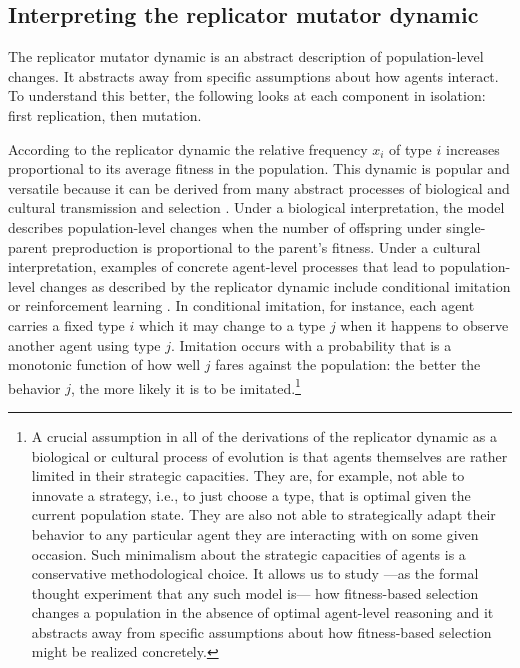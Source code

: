 \documentclass[a4paper, 11pt]{article}
\theoremstyle{Satz}
\begin{document}
\subsection{Interpreting the replicator mutator dynamic}

The replicator mutator dynamic is an abstract description of population-level changes. It
abstracts away from specific assumptions about how agents interact. To understand this better,
the following looks at each component in isolation: first replication, then mutation.

According to the replicator dynamic the relative frequency $x_i$ of type $i$ increases
proportional to its average fitness in the population. This dynamic is popular and versatile
because it can be derived from many abstract processes of biological and cultural transmission
and selection \citep[for overview and several derivations
see][]{Sandholm2010:Population-Game}. Under a biological interpretation, the model describes
population-level changes when the number of offspring under single-parent preproduction is
proportional to the parent's fitness. Under a cultural interpretation, examples of concrete
agent-level processes that lead to population-level changes as described by the replicator
dynamic include conditional imitation
\citep[e.g.,][]{Helbing1996:A-Stochastic-Be,Schlag1998:Why-Imitate-and} or reinforcement
learning \citep[e.g.,][]{BorgersSarin997:Learning-Throug,Beggs2005:On-the-Converge}. In
conditional imitation, for instance, each agent carries a fixed type $i$ which it may change to
a type $j$ when it happens to observe another agent using type $j$. Imitation occurs with a
probability that is a monotonic function of how well $j$ fares against the population: the
better the behavior $j$, the more likely it is to be imitated.\footnote{A crucial assumption in
  all of the derivations of the replicator dynamic as a biological or cultural process of
  evolution is that agents themselves are rather limited in their strategic capacities. They
  are, for example, not able to innovate a strategy, i.e., to just choose a type, that is
  optimal given the current population state. They are also not able to strategically adapt
  their behavior to any particular agent they are interacting with on some given occasion. Such
  minimalism about the strategic capacities of agents is a conservative methodological
  choice. It allows us to study ---as the formal thought experiment that any such model is---
  how fitness-based selection changes a population in the absence of optimal agent-level
  reasoning and it abstracts away from specific assumptions about how fitness-based selection
  might be realized concretely.}
\end{document}
